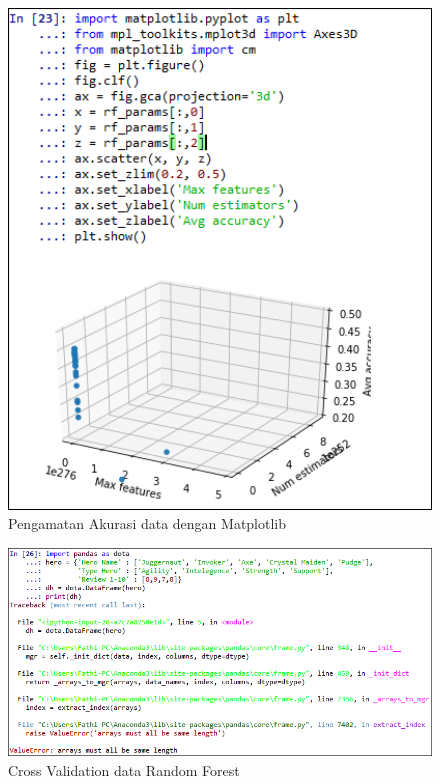\begin{figure}[ht]
	\centerline{\includegraphics[width=1\textwidth]{figures/fathi/chapter3/hari2/12.png}}
	\caption{Pengamatan Akurasi data dengan Matplotlib}
	\label{p9}
\end{figure}

\begin{figure}[ht]
	\centerline{\includegraphics[width=1\textwidth]{figures/fathi/chapter3/hari2/error.png}}
	\caption{Cross Validation data Random Forest}
	\label{error}
\end{figure}

